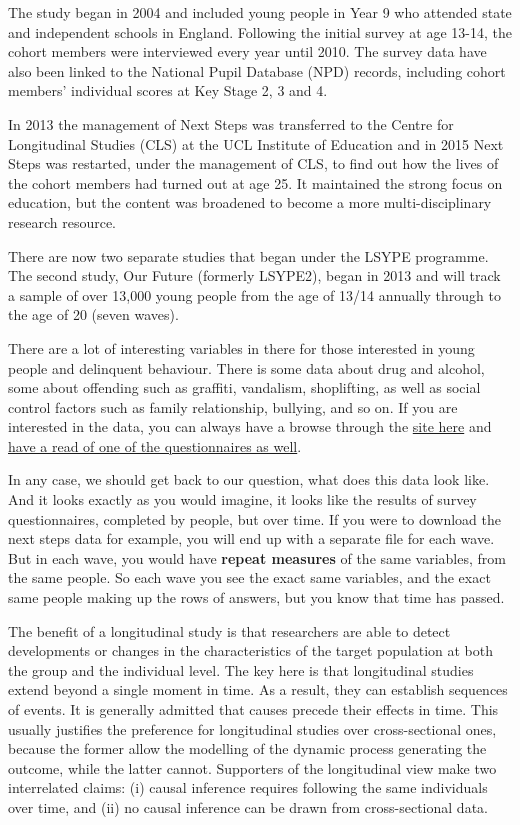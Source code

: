 \documentclass[]{book}
\theoremstyle{definition}
\theoremstyle{definition}
\theoremstyle{definition}
\theoremstyle{remark}
\begin{document}
The study began in 2004 and included young people in Year 9 who attended
state and independent schools in England. Following the initial survey
at age 13-14, the cohort members were interviewed every year until 2010.
The survey data have also been linked to the National Pupil Database
(NPD) records, including cohort members' individual scores at Key Stage
2, 3 and 4.

In 2013 the management of Next Steps was transferred to the Centre for
Longitudinal Studies (CLS) at the UCL Institute of Education and in 2015
Next Steps was restarted, under the management of CLS, to find out how
the lives of the cohort members had turned out at age 25. It maintained
the strong focus on education, but the content was broadened to become a
more multi-disciplinary research resource.

There are now two separate studies that began under the LSYPE programme.
The second study, Our Future (formerly LSYPE2), began in 2013 and will
track a sample of over 13,000 young people from the age of 13/14
annually through to the age of 20 (seven waves).

There are a lot of interesting variables in there for those interested
in young people and delinquent behaviour. There is some data about drug
and alcohol, some about offending such as graffiti, vandalism,
shoplifting, as well as social control factors such as family
relationship, bullying, and so on. If you are interested in the data,
you can always have a browse through the
\href{https://discover.ukdataservice.ac.uk/Catalogue/?sn=5545\&type=Data\%20catalogue\&lt}{site
here} and
\href{http://doc.ukdataservice.ac.uk/doc/5545/mrdoc/pdf/5545age_25_survey_questionnaire.pdf}{have
a read of one of the questionnaires as well}.

In any case, we should get back to our question, what does this data
look like. And it looks exactly as you would imagine, it looks like the
results of survey questionnaires, completed by people, but over time. If
you were to download the next steps data for example, you will end up
with a separate file for each wave. But in each wave, you would have
\textbf{repeat measures} of the same variables, from the same people. So
each wave you see the exact same variables, and the exact same people
making up the rows of answers, but you know that time has passed.

The benefit of a longitudinal study is that researchers are able to
detect developments or changes in the characteristics of the target
population at both the group and the individual level. The key here is
that longitudinal studies extend beyond a single moment in time. As a
result, they can establish sequences of events. It is generally admitted
that causes precede their effects in time. This usually justifies the
preference for longitudinal studies over cross-sectional ones, because
the former allow the modelling of the dynamic process generating the
outcome, while the latter cannot. Supporters of the longitudinal view
make two interrelated claims: (i) causal inference requires following
the same individuals over time, and (ii) no causal inference can be
drawn from cross-sectional data.
\end{document}
